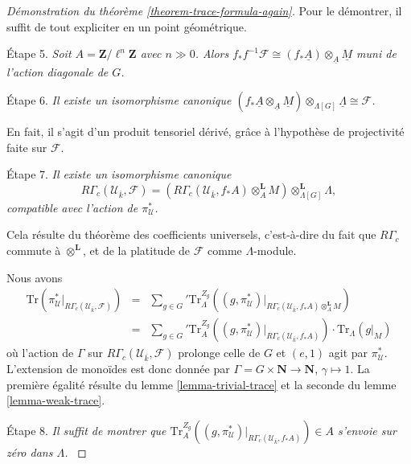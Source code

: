 \begin{proof}[Démonstration du théorème \ref{theorem-trace-formula-again}]
\medskip\noindent
Pour le démontrer, il suffit de tout expliciter en un point géométrique.

\medskip\noindent
Étape 5. {\it Soit $A = \mathbf{Z}/\ell^n \mathbf{Z}$ avec $n\gg 0$. Alors
$f_*f^{-1}\mathcal{F} \cong (f_*\underline A)
\otimes_{\underline A} \underline M$ muni de l'action diagonale de $G$.}

\medskip\noindent
Étape 6. {\it Il existe un isomorphisme canonique
$(f_*\underline A \otimes_{\underline A} \underline M)
\otimes_{\Lambda[G]} \underline \Lambda \cong \mathcal{F}$.
}

\medskip\noindent
En fait, il s'agit d'un produit tensoriel dérivé, grâce à l'hypothèse de projectivité
faite sur $\mathcal{F}$.

\medskip\noindent
Étape 7. {\it Il existe un isomorphisme canonique
$$
R\Gamma_c(\mathcal{U}_{\bar k}, \mathcal{F})
= (R\Gamma_c(\mathcal{U}_{\bar k}, f_*A)\otimes_A^\mathbf{L}
M)\otimes_{\Lambda[G]}^\mathbf{L} \Lambda,
$$
compatible avec l'action de $\pi^*_\mathcal{U}$.
}

\medskip\noindent
Cela résulte du théorème des coefficients universels, c'est-à-dire du fait que
$R\Gamma_c$ commute à $\otimes^\mathbf{L}$, et de la platitude de
$\mathcal{F}$ comme $\Lambda$-module.

\medskip\noindent
Nous avons
\begin{eqnarray*}
\text{Tr}(
\pi_\mathcal{U}^* |_{R\Gamma_c(\mathcal{U}_{\bar k}, \mathcal{F})})
& = &
{\sum_{g \in G}}'
\text{Tr}_{\Lambda}^{Z_g}
\left(
(g, \pi_\mathcal{U}^*)
|_{R\Gamma_c(\mathcal{U}_{\bar k}, f_*A)\otimes_A^\mathbf{L} M}
\right) \\
& = &
{\sum_{g\in G}}'
\text{Tr}_A^{Z_g}
(
(g, \pi_\mathcal{U}^*) |_{R\Gamma_c(\mathcal{U}_{\bar k}, f_*A)}
)
\cdot
\text{Tr}_\Lambda(g|_M)
\end{eqnarray*}
où l'action de $\Gamma$ sur $R\Gamma_c(\mathcal{U}_{\bar k}, \mathcal{F})$ prolonge celle de $G$
et $(e, 1)$ agit par $\pi_\mathcal{U}^*$. L'extension de monoïdes est donc donnée
par $\Gamma = G \times \mathbf{N} \to \mathbf{N}$, $\gamma \mapsto 1$. La première
égalité résulte du lemme \ref{lemma-trivial-trace} et la seconde du
lemme \ref{lemma-weak-trace}.

\medskip\noindent
Étape 8. {\it Il suffit de montrer que
$\text{Tr}_A^{Z_g}((g, \pi_\mathcal{U}^*)
|_{R\Gamma_c(\mathcal{U}_{\bar k}, f_*A)}) \in A$
s'envoie sur zéro dans $\Lambda$.
}


\end{proof}
